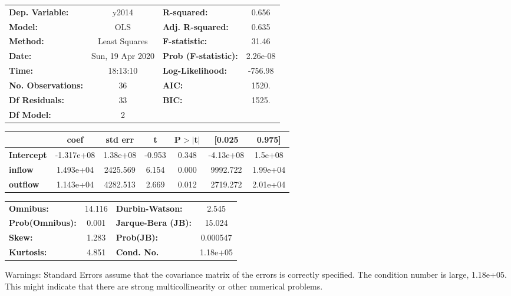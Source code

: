 \begin{center}
\begin{tabular}{lclc}
\toprule
\textbf{Dep. Variable:}    &      y2014       & \textbf{  R-squared:         } &     0.656   \\
\textbf{Model:}            &       OLS        & \textbf{  Adj. R-squared:    } &     0.635   \\
\textbf{Method:}           &  Least Squares   & \textbf{  F-statistic:       } &     31.46   \\
\textbf{Date:}             & Sun, 19 Apr 2020 & \textbf{  Prob (F-statistic):} &  2.26e-08   \\
\textbf{Time:}             &     18:13:10     & \textbf{  Log-Likelihood:    } &   -756.98   \\
\textbf{No. Observations:} &          36      & \textbf{  AIC:               } &     1520.   \\
\textbf{Df Residuals:}     &          33      & \textbf{  BIC:               } &     1525.   \\
\textbf{Df Model:}         &           2      & \textbf{                     } &             \\
\bottomrule
\end{tabular}
\begin{tabular}{lcccccc}
                   & \textbf{coef} & \textbf{std err} & \textbf{t} & \textbf{P$> |$t$|$} & \textbf{[0.025} & \textbf{0.975]}  \\
\midrule
\textbf{Intercept} &   -1.317e+08  &     1.38e+08     &    -0.953  &         0.348        &    -4.13e+08    &      1.5e+08     \\
\textbf{inflow}    &    1.493e+04  &     2425.569     &     6.154  &         0.000        &     9992.722    &     1.99e+04     \\
\textbf{outflow}   &    1.143e+04  &     4282.513     &     2.669  &         0.012        &     2719.272    &     2.01e+04     \\
\bottomrule
\end{tabular}
\begin{tabular}{lclc}
\textbf{Omnibus:}       & 14.116 & \textbf{  Durbin-Watson:     } &    2.545  \\
\textbf{Prob(Omnibus):} &  0.001 & \textbf{  Jarque-Bera (JB):  } &   15.024  \\
\textbf{Skew:}          &  1.283 & \textbf{  Prob(JB):          } & 0.000547  \\
\textbf{Kurtosis:}      &  4.851 & \textbf{  Cond. No.          } & 1.18e+05  \\
\bottomrule
\end{tabular}
\end{center}

Warnings: \newline
 [1] Standard Errors assume that the covariance matrix of the errors is correctly specified. \newline
 [2] The condition number is large, 1.18e+05. This might indicate that there are \newline
 strong multicollinearity or other numerical problems.